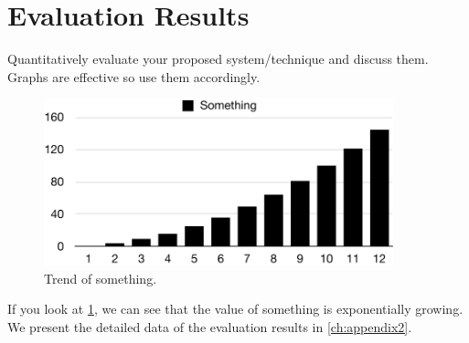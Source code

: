 \section{Evaluation Results}\label{sec:results}

Quantitatively evaluate your proposed system/technique and discuss them.
Graphs are effective so use them accordingly.

\begin{figure}[ht]
  \centering
  \includegraphics[width=0.9\textwidth]{examples/graphs/something}
  \caption{Trend of something.}\label{fig:something}
\end{figure}

If you look at \cref{fig:something}, we can see that the value of something is exponentially growing.
We present the detailed data of the evaluation results in \cref{ch:appendix2}.